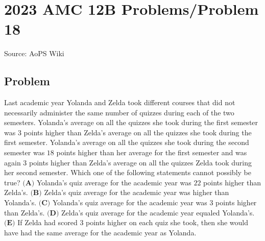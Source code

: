 \documentclass[12pt]{article}
\begin{document}
\section*{{2023 AMC 12B Problems/Problem 18}}
Source: AoPS Wiki

\subsection*{Problem}
Last academic year Yolanda and Zelda took different courses that did not necessarily administer the same number of quizzes during each of the two semesters. Yolanda's average on all the quizzes she took during the first semester was $3$ points higher than Zelda's average on all the quizzes she took during the first semester. Yolanda's average on all the quizzes she took during the second semester was $18$ points higher than her average for the first semester and was again $3$ points higher than Zelda's average on all the quizzes Zelda took during her second semester. Which one of the following statements cannot possibly be true? $\textbf{(A)}$ Yolanda's quiz average for the academic year was $22$ points higher than Zelda's. $\textbf{(B)}$ Zelda's quiz average for the academic year was higher than Yolanda's. $\textbf{(C)}$ Yolanda's quiz average for the academic year was $3$ points higher than Zelda's. $\textbf{(D)}$ Zelda's quiz average for the academic year equaled Yolanda's. $\textbf{(E)}$ If Zelda had scored $3$ points higher on each quiz she took, then she would have had the same average for the academic year as Yolanda.
\end{document}
